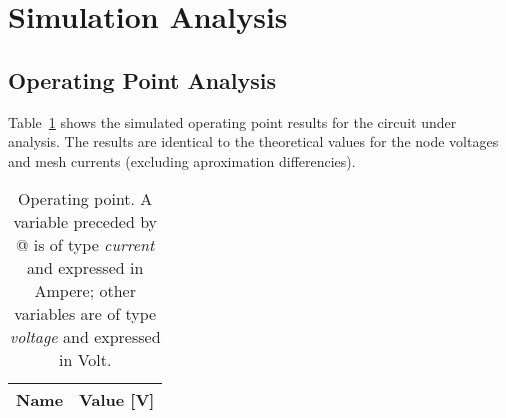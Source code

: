 \pagebreak
\section{Simulation Analysis}
\label{sec:simulation}

\subsection{Operating Point Analysis}

Table~\ref{tab:op} shows the simulated operating point results for the circuit
under analysis. The results are identical to the theoretical values for the node voltages and mesh currents (excluding aproximation differencies).

\begin{table}[h]
  \centering
  \begin{tabular}{|l|r|}
    \hline    
    {\bf Name} & {\bf Value [V]} \\ \hline
    
  \end{tabular}
  \caption{Operating point. A variable preceded by @ is of type {\em current}
    and expressed in Ampere; other variables are of type {\it voltage} and expressed in
    Volt.}
  \label{tab:op}
\end{table}





